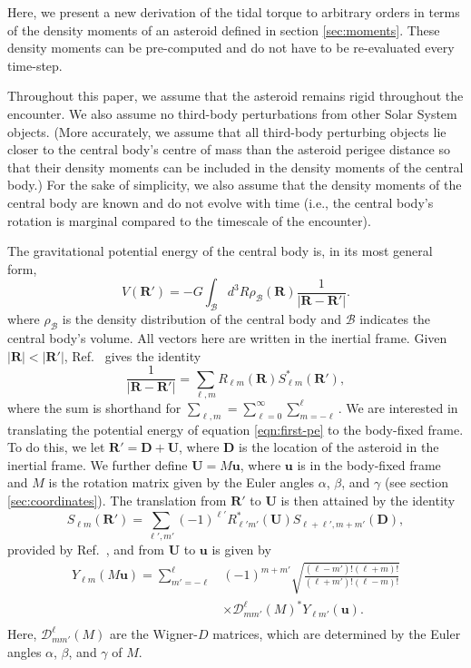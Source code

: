 Here, we present a new derivation of the tidal torque to arbitrary orders in terms of the density moments of an asteroid defined in section \ref{sec:moments}. These density moments can be pre-computed and do not have to be re-evaluated every time-step.

Throughout this paper, we assume that the asteroid remains rigid throughout the encounter. We also assume no third-body perturbations from other Solar System objects. (More accurately, we assume that all third-body perturbing objects lie closer to the central body's centre of mass than the asteroid perigee distance so that their density moments can be included in the density moments of the central body.) For the sake of simplicity, we also assume that the density moments of the central body are known and do not evolve with time (i.e., the central body's rotation is marginal compared to the timescale of the encounter).

The gravitational potential energy of the central body is, in its most general form,
\begin{equation}
V(\bm R') = -G\int_\mathcal{B} d^3 R \rho_\mathcal{B}(\bm R) \frac{1}{|\bm{R}-\bm{R'}|}.
\label{eqn:first-pe}
\end{equation}
where $\rho_\mathcal{B}$ is the density distribution of the central body and $\mathcal{B}$ indicates the central body's volume. All vectors here are written in the inertial frame. Given $|\bm{R}| < |\bm{R'}|$, Ref.~\cite{Gelderen1998TheSO} gives the identity
\begin{equation}
  \frac{1}{|\bm R - \bm R'|} = \sum_{\ell, m} R_{\ell m}(\bm R) S_{\ell m}^*(\bm R'),
  \label{eqn:ylm-expansion}
\end{equation}
where the sum is shorthand for $\sum_{\ell, m} = \sum_{\ell = 0}^\infty \sum_{m=-\ell}^\ell$.
We are interested in translating the potential energy of equation \ref{eqn:first-pe} to the body-fixed frame. To do this, we let $\bm{R'} = \bm D + \bm U$, where $\bm D$ is the location of the asteroid in the inertial frame. We further define $\bm U = M\bm u$, where $\bm u$ is in the body-fixed frame and $M$ is the rotation matrix given by the Euler angles $\alpha$, $\beta$, and $\gamma$ (see section \ref{sec:coordinates}). The translation from $\bm {R'}$ to $\bm U$ is then attained by the identity 
\begin{equation}
  S_{\ell m}(\bm R') = \sum_{\ell', m'} (-1)^{\ell'}R^*_{\ell' m'}(\bm U)S_{\ell+\ell', m + m'} (\bm D),
  \label{eqn:ylm-translation}
\end{equation}  
provided by Ref.~\cite{Gelderen1998TheSO}, and from $\bm U$ to $\bm u$ is given by
\begin{equation}
  \begin{split}
    Y_{\ell m}(M\bm u) = \sum_{m'=-\ell}^\ell & (-1)^{m+m'}\sqrt{\frac{(\ell-m')!(\ell+m)!}{(\ell+m')!(\ell-m)!}} \\
    & \times \mathcal{D}^\ell_{mm'}(M)^* Y_{\ell m'}(\bm u).\\
  \end{split}
  \label{eqn:ylm-rotation}
\end{equation}
Here, $\mathcal{D}^\ell_{mm'}(M)$ are the Wigner-$D$ matrices, which are determined by the Euler angles $\alpha$, $\beta$, and $\gamma$ of $M$.

